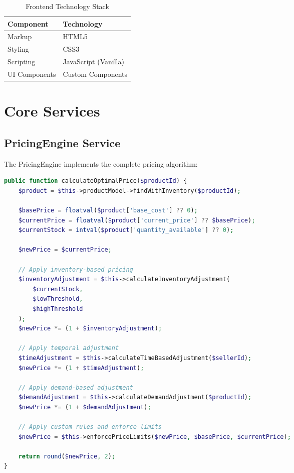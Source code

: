 \documentclass[12pt,a4paper,oneside]{report}
\begin{document}
\begin{table}[H]
    \centering
    \begin{tabular}{ll}
        \toprule
        \textbf{Component} & \textbf{Technology} \\
        \midrule
        Markup & HTML5 \\
        Styling & CSS3 \\
        Scripting & JavaScript (Vanilla) \\
        UI Components & Custom Components \\
        \bottomrule
    \end{tabular}
    \caption{Frontend Technology Stack}
    \label{tab:frontend_stack}
\end{table}

\section{Core Services}

\subsection{PricingEngine Service}

The PricingEngine implements the complete pricing algorithm:

\begin{lstlisting}[language=PHP, caption=PricingEngine Main Method]
public function calculateOptimalPrice($productId) {
    $product = $this->productModel->findWithInventory($productId);
    
    $basePrice = floatval($product['base_cost'] ?? 0);
    $currentPrice = floatval($product['current_price'] ?? $basePrice);
    $currentStock = intval($product['quantity_available'] ?? 0);
    
    $newPrice = $currentPrice;
    
    // Apply inventory-based pricing
    $inventoryAdjustment = $this->calculateInventoryAdjustment(
        $currentStock, 
        $lowThreshold, 
        $highThreshold
    );
    $newPrice *= (1 + $inventoryAdjustment);
    
    // Apply temporal adjustment
    $timeAdjustment = $this->calculateTimeBasedAdjustment($sellerId);
    $newPrice *= (1 + $timeAdjustment);
    
    // Apply demand-based adjustment
    $demandAdjustment = $this->calculateDemandAdjustment($productId);
    $newPrice *= (1 + $demandAdjustment);
    
    // Apply custom rules and enforce limits
    $newPrice = $this->enforcePriceLimits($newPrice, $basePrice, $currentPrice);
    
    return round($newPrice, 2);
}
\end{lstlisting}
\end{document}
